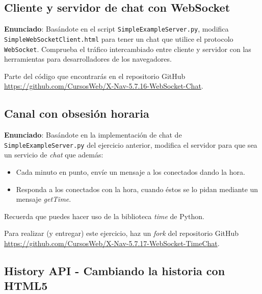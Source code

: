 \subsection{Cliente y servidor de chat con WebSocket}
\label{subsec:websocket-cliente-servidor-chat}

\textbf{Enunciado}: Basándote en el script \texttt{SimpleExampleServer.py}, modifica \texttt{SimpleWebSocketClient.html} para tener un chat que utilice el protocolo \texttt{WebSocket}. Comprueba el tráfico intercambiado entre cliente y servidor con las herramientas para desarrolladores de los navegadores. 

Parte del código que encontrarás en el repositorio GitHub  \url{https://github.com/CursosWeb/X-Nav-5.7.16-WebSocket-Chat}.


\subsection{Canal con obsesión horaria}
\label{subsec:websocket-canal-obsesion-horaria}

\textbf{Enunciado}: Basándote en la implementación de chat de \texttt{SimpleExampleServer.py} del ejercicio anterior, modifica el servidor para que sea un servicio de \emph{chat} que además:
\begin{itemize}
  \item Cada minuto en punto, envíe un mensaje a los conectados dando la hora.
  \item Responda a los conectados con la hora, cuando éstos se lo pidan mediante un mensaje \emph{getTime}.
\end{itemize}

Recuerda que puedes hacer uso de la biblioteca \emph{time} de Python.

Para realizar (y entregar) este ejercicio, haz un \emph{fork} del repositorio GitHub \url{https://github.com/CursosWeb/X-Nav-5.7.17-WebSocket-TimeChat}.


\subsection{History API - Cambiando la historia con HTML5}
\label{subsec:cambiando-historia}

